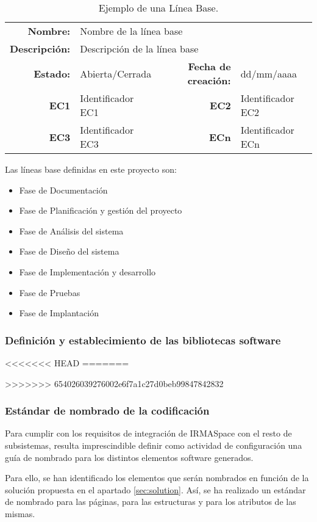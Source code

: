\begin{table}[h]
\begin{center}
\begin{tabular}{ r l | r l }
\hline
\textbf{Nombre:} & \multicolumn{3}{l}{Nombre de la línea base} \\
\textbf{Descripción:} & \multicolumn{3}{l}{Descripción de la línea base} \\ \hline \hline
\textbf{Estado:} & Abierta/Cerrada & \textbf{Fecha de creación:} & dd/mm/aaaa \\
\textbf{EC1} & Identificador EC1 & \textbf{EC2} & Identificador EC2 \\
\textbf{EC3} & Identificador EC3 & \textbf{ECn} & Identificador ECn \\
\hline
\end{tabular}
\caption{Ejemplo de una Línea Base.}
\label{tab:baseLine}
\end{center}
\end{table}

\par Las líneas base definidas en este proyecto son:
\begin{itemize}[-]
  \item Fase de Documentación
  \item Fase de Planificación y gestión del proyecto
  \item Fase de Análisis del sistema
  \item Fase de Diseño del sistema
  \item Fase de Implementación y desarrollo
  \item Fase de Pruebas
  \item Fase de Implantación
\end{itemize}


\subsubsection{Definición y establecimiento de las bibliotecas software}
<<<<<<< HEAD
=======

>>>>>>> 654026039276002e6f7a1c27d0beb99847842832

\subsubsection{Estándar de nombrado de la codificación}
\par Para cumplir con los requisitos de integración de IRMASpace con el resto de subsistemas, resulta imprescindible definir como actividad de configuración una guía de nombrado para los distintos elementos software generados.
\par Para ello, se han identificado los elementos que serán nombrados en función de la solución propuesta en el apartado \ref{sec:solution}. Así, se ha realizado un estándar de nombrado para las páginas, para las estructuras y para los atributos de las mismas.

